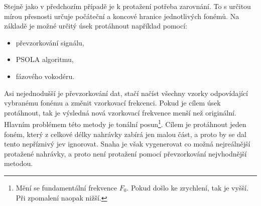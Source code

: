 Stejně jako v předchozím případě je k protažení potřeba zarovnání. To s určitou mírou přesnosti určuje počáteční a koncové hranice jednotlivých fonémů. Na základě je možné určitý úsek protáhnout například pomocí:

\begin{itemize}
  \item převzorkování signálu,
  \item PSOLA algoritmu,
  \item fázového vokodéru.
\end{itemize}

\noindent Asi nejednodušší je převzorkování dat, stačí načíst všechny vzorky odpovídající vybranému fonému a změnit vzorkovací frekcenci. Pokud je cílem úsek protáhnout, tak je výsledná nová vzorkovací frekvence menší než originální. Hlavním problémem této metody je tonální posun\footnote{Mění se fundamentální frekvence $F_0$. Pokud došlo ke zrychlení, tak je vyšší. Při zpomalení naopak nižší.}. Cílem je protáhnout jeden foném, který z celkové délky nahrávky zabírá jen malou část, a proto by se dal tento nepříznivý jev ignorovat. Snaha je však vygenerovat co možná nejreálnější protažené nahrávky, a proto není protažení pomocí převzorkování nejvhodnější metodou.


